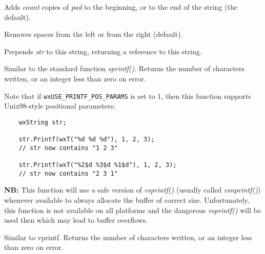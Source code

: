 \label{wxstringpad}


Adds {\it count} copies of {\it pad} to the beginning, or to the end of the string (the default).

Removes spaces from the left or from the right (default).


\label{wxstringprepend}


Prepends {\it str} to this string, returning a reference to this string.


\label{wxstringprintf}


Similar to the standard function {\it sprintf()}. Returns the number of
characters written, or an integer less than zero on error.

Note that if {\tt wxUSE\_PRINTF\_POS\_PARAMS} is set to 1, then this function supports
Unix98-style positional parameters:

\begin{verbatim}
    wxString str;

    str.Printf(wxT("%d %d %d"), 1, 2, 3);
    // str now contains "1 2 3"

    str.Printf(wxT("%2$d %3$d %1$d"), 1, 2, 3);
    // str now contains "2 3 1"
\end{verbatim}

{\bf NB:} This function will use a safe version of {\it vsprintf()} (usually called 
{\it vsnprintf()}) whenever available to always allocate the buffer of correct
size. Unfortunately, this function is not available on all platforms and the
dangerous {\it vsprintf()} will be used then which may lead to buffer overflows.


\label{wxstringprintfv}


Similar to vprintf. Returns the number of characters written, or an integer less than zero
on error.


\label{wxstringremove}



